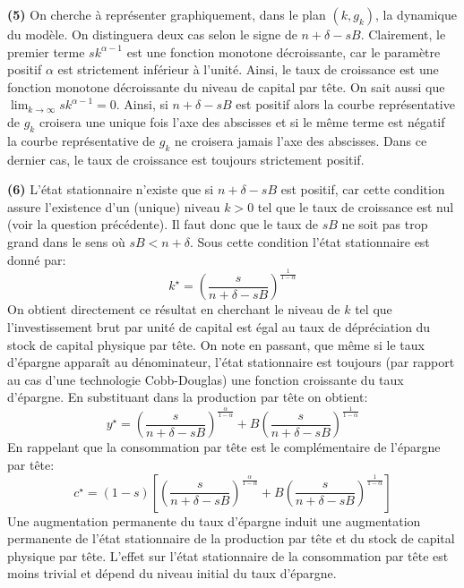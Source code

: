 \documentclass[10pt,a4paper,notitlepage]{article}
\newcommand{\question}[1]{\textbf{(#1)}}
\begin{document}
\question{5} On cherche à représenter graphiquement, dans le plan
$(k,g_k)$, la dynamique du modèle. On distinguera deux cas selon le
signe de $n+\delta-sB$. Clairement, le premier terme $sk^{\alpha-1}$
est une fonction monotone décroissante, car le paramètre positif
$\alpha$ est strictement inférieur à l'unité. Ainsi, le taux de
croissance est une fonction monotone décroissante du niveau de capital
par tête. On sait aussi que
$\lim_{k\rightarrow\infty}sk^{\alpha-1}=0$. Ainsi, si
$n+\delta-sB$ est positif alors la courbe représentative de $g_k$ croisera une
unique fois l'axe des abscisses et si le même terme est négatif la
courbe représentative de $g_k$ ne croisera jamais l'axe des
abscisses. Dans ce dernier cas, le taux de croissance est toujours
strictement positif.


\bigskip

\question{6} L'état stationnaire n'existe que si $n+\delta-sB$ est
positif, car cette condition assure l'existence d'un (unique) niveau
$k>0$ tel que le taux de croissance est nul (voir la question
précédente). Il faut donc que le taux de $sB$ ne soit pas trop grand
dans le sens où $sB<n+\delta$. Sous cette condition l'état
stationnaire est donné par:
\[
k^{\star} = \left(\frac{s}{n+\delta-sB}\right)^{\frac{1}{1-\alpha}}
\]
On obtient directement ce résultat en cherchant le niveau de $k$ tel
que l'investissement brut par unité de capital est égal au taux de
dépréciation du stock de capital physique par tête. On note en
passant, que même si le taux d'épargne apparaît au dénominateur,
l'état stationnaire est toujours (par rapport au cas d'une technologie
Cobb-Douglas) une fonction croissante du taux d'épargne. En
substituant dans la production par tête on obtient:
\[
y^{\star} = \left(\frac{s}{n+\delta-sB}\right)^{\frac{\alpha}{1-\alpha}}+B\left(\frac{s}{n+\delta-sB}\right)^{\frac{1}{1-\alpha}}
\]
En rappelant que la consommation par tête est le complémentaire de
l'épargne par tête:
\[
c^{\star} = (1-s)\left[\left(\frac{s}{n+\delta-sB}\right)^{\frac{\alpha}{1-\alpha}}+B\left(\frac{s}{n+\delta-sB}\right)^{\frac{1}{1-\alpha}}\right]
\]
Une augmentation permanente du taux d'épargne induit une augmentation
permanente de l'état stationnaire de la production par tête et du
stock de capital physique par tête. L'effet sur l'état stationnaire de
la consommation par tête est moins trivial et dépend du niveau initial
du taux d'épargne.\newline
\end{document}
